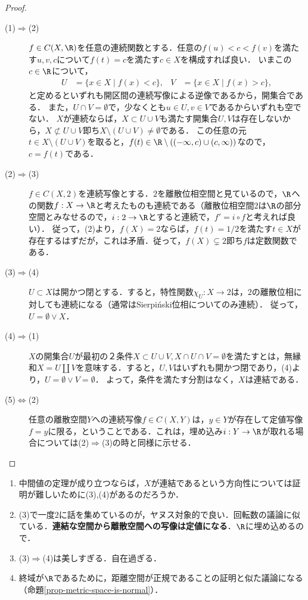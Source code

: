 \documentclass[uplatex,dvipdfmx]{jsreport}
\begin{document}
\begin{proof}
    \begin{description}
        \item[(1)$\Rightarrow$(2)] 
        $f\in C(X,\R)$を任意の連続関数とする．任意の$f(u)<c<f(v)$を満たす$u,v,c$について$f(t)=c$を満たす$c\in X$を構成すれば良い．
        いまこの$c\in\R$について，
        \begin{align*}
            U&=\{x\in X\mid f(x)<c\},&V&=\{x\in X\mid f(x)>c\},
        \end{align*}
        と定めるといずれも開区間の連続写像による逆像であるから，開集合である．
        また，$U\cap V=\emptyset$で，少なくとも$u\in U,v\in V$であるからいずれも空でない．
        $X$が連続ならば，$X\subset U\cup V$も満たす開集合$U,V$は存在しないから，$X\not\subset U\cup V$即ち$X\setminus(U\cup V)\ne\emptyset$である．
        この任意の元$t\in X\setminus(U\cup V)$を取ると，$f(t)\in\R\setminus((-\infty,c)\cup(c,\infty))$なので，
        $c=f(t)$である．
        \item[(2)$\Rightarrow$(3)]
        $f\in C(X,2)$を連続写像とする．$2$を離散位相空間と見ているので，$\R$への関数$f:X\to\R$と考えたものも連続である（離散位相空間$2$は$\R$の部分空間とみなせるので，$i:2\to\R$とすると連続で，$f'=i\circ f$と考えれば良い）．
        従って，(2)より，$f(X)=2$ならば，$f(t)=1/2$を満たす$t\in X$が存在するはずだが，これは矛盾．従って，$f(X)\subsetneq 2$即ち$f$は定数関数である．
        \item[(3)$\Rightarrow$(4)]
        $U\subset X$は開かつ閉とする．すると，特性関数$\chi_U:X\to 2$は，$2$の離散位相に対しても連続になる（通常はSierpiński位相についてのみ連続）．
        従って，$U=\emptyset\lor X$．
        \item[(4)$\Rightarrow$(1)]
        $X$の開集合$U$が最初の２条件$X\subset U\cup V,X\cap U\cap V=\emptyset$を満たすとは，無縁和$X=U\coprod V$を意味する．すると，$U,V$はいずれも開かつ閉であり，(4)より，$U=\emptyset\lor V=\emptyset$．
        よって，条件を満たす分割はなく，$X$は連結である．
        \item[(5)$\Leftrightarrow$(2)]
        任意の離散空間$Y$への連続写像$f\in C(X,Y)$は，$y\in Y$が存在して定値写像$f=y$に限る，ということである．これは，埋め込み$i:Y\to\R$が取れる場合については(2)$\Rightarrow$(3)の時と同様に示せる．
    \end{description}
\end{proof}
\begin{remarks}\mbox{}
    \begin{enumerate}
        \item 中間値の定理が成り立つならば，$X$が連結であるという方向性については証明が難しいために(3),(4)があるのだろうか．
        \item (3)で一度$2$に話を集めているのが，ヤヌス対象的で良い．回転数の議論に似ている．\textbf{連結な空間から離散空間への写像は定値になる}．$\R$に埋め込めるので．
        \item (3)$\Rightarrow$(4)は美しすぎる．自在過ぎる．
        \item 終域が$\R$であるために，距離空間が正規であることの証明と似た議論になる（命題\ref{prop-metric-space-is-normal}）．
    \end{enumerate}
\end{remarks}
\end{document}
